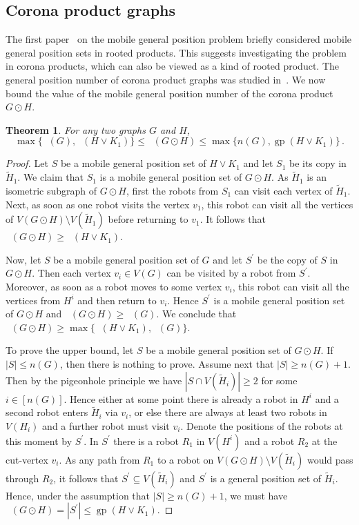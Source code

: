 \documentclass[a4paper,12pt]{article}
\DeclareMathOperator{\mob}{Mob_{gp}}
\DeclareMathOperator{\gp}{gp}
\newtheorem{theorem}{Theorem}[section]
\theoremstyle{definition}
\begin{document}
	\subsection{Corona product graphs}
	
	The first paper~\cite{klavzar-2023} on the mobile general position problem briefly considered mobile general position sets in rooted products. This suggests investigating the problem in corona products, which can also be viewed as a kind of rooted product. The general position number of corona product graphs was studied in~\cite{ghorbani-2021}. We now bound the value of the mobile general position number of the corona product $G\odot H$. 
	
	\begin{theorem}
		\label{thm:corona-bounds}
		For any two graphs $G$ and $H$,
		$$\max \{ \mob(G), \mob(H \vee K_1) \} \le \mob(G\odot H) \le \max \{n(G), \gp(H \vee K_1)\}\,.$$
	\end{theorem}
	
	\begin{proof}
		Let $S$ be a mobile general position set of $H\vee K_1$ and let $S_1$ be its copy in $\widetilde{H}_1$. We claim that $S_1$ is a mobile general position set of $G\odot H$. As $\widetilde{H}_1$ is an isometric subgraph of $G \odot H$, first the robots from $S_1$ can visit each vertex of $\widetilde{H}_1$. Next, as soon as one robot visits the vertex $v_1$, this robot can visit all the vertices of $V(G\odot H)\setminus V(\widetilde{H}_1)$ before returning to $v_1$. It follows that $\mob(G\odot H) \ge \mob(H \vee K_1)$. 
		
		Now, let $S$ be a mobile general position set of $G$ and let $S^{\prime }$ be the copy of $S$ in $G\odot H$. Then each vertex $v_i\in V(G)$ can be visited by a robot from $S^{\prime }$. Moreover, as soon as a robot moves to some vertex $v_i$, this robot can visit all the vertices from $H^i$ and then return to $v_i$. Hence $S^{\prime }$ is a mobile general position set of $G\odot H$ and $\mob(G\odot H) \ge \mob(G)$. We conclude that $\mob(G\odot H) \ge \max\{ \mob(H \vee K_1), \mob(G)\}$. 
		
		To prove the upper bound, let $S$ be a mobile general position set of $G\odot H$. If $|S|\le n(G)$, then there is nothing to prove. Assume next that $|S| \ge n(G)+1$. Then by the pigeonhole principle we have $|S \cap V(\widetilde{H}_i)| \ge 2$ for some $i\in [n(G)]$. Hence either at some point there is already a robot in $H^i$ and a second robot enters $\widetilde{H}_i$ via $v_i$, or else there are always at least two robots in $V(H_i)$ and a further robot must visit $v_i$. Denote the positions of the robots at this moment by $S^{\prime }$. In $S^{\prime }$ there is a robot $R_1$ in $V(H^i)$ and a robot $R_2$ at the cut-vertex $v_i$. As any path from $R_1$ to a robot on $V(G \odot H) \setminus V(\widetilde{H}_i)$ would pass through $R_2$, it follows that $S^{\prime } \subseteq V(\widetilde{H}_i)$ and $S^{\prime }$ is a general position set of $\widetilde{H}_i$. Hence, under the assumption that $|S| \ge n(G)+1$, we must have $\mob(G\odot H) = |S^{\prime }| \le \gp(H \vee K_1)$. 
	\end{proof}
	
\end{document}
